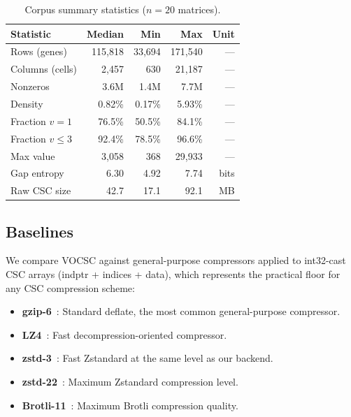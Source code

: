 \documentclass[10pt,twocolumn,letterpaper]{article}
\begin{document}
\begin{table}[t]
\centering
\caption{Corpus summary statistics ($n=20$ matrices).}
\label{tab:corpus}
\footnotesize
\begin{tabular}{lrrrr}
\toprule
Statistic & Median & Min & Max & Unit \\
\midrule
Rows (genes)        & 115,818 & 33,694 & 171,540 & --- \\
Columns (cells)     &   2,457 &    630 &  21,187 & --- \\
Nonzeros            &    3.6M &   1.4M &    7.7M & --- \\
Density             &  0.82\% & 0.17\% &  5.93\% & --- \\
Fraction $v{=}1$    &  76.5\% & 50.5\% &  84.1\% & --- \\
Fraction $v{\leq}3$ &  92.4\% & 78.5\% &  96.6\% & --- \\
Max value           &   3,058 &    368 &  29,933 & --- \\
Gap entropy         &    6.30 &   4.92 &    7.74 & bits \\
Raw CSC size        &  42.7 &  17.1 &  92.1 & MB \\
\bottomrule
\end{tabular}
\end{table}

\subsection{Baselines}

We compare VOCSC against general-purpose compressors applied to int32-cast CSC arrays (indptr + indices + data), which represents the practical floor for any CSC compression scheme:

\begin{itemize}
\item \textbf{gzip-6}~\cite{deutsch1996gzip}: Standard deflate, the most common general-purpose compressor.
\item \textbf{LZ4}~\cite{collet2013lz4}: Fast decompression-oriented compressor.
\item \textbf{zstd-3}~\cite{collet2018zstandard}: Fast Zstandard at the same level as our backend.
\item \textbf{zstd-22}~\cite{collet2018zstandard}: Maximum Zstandard compression level.
\item \textbf{Brotli-11}~\cite{alakuijala2019brotli}: Maximum Brotli compression quality.
\end{itemize}
\end{document}
